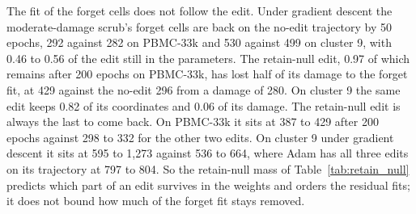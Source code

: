 \documentclass{article}
\begin{document}
The fit of the forget cells does not follow the edit. Under gradient descent the moderate-damage scrub's forget cells are back on the no-edit trajectory by 50 epochs, 292 against 282 on PBMC-33k and 530 against 499 on cluster 9, with 0.46 to 0.56 of the edit still in the parameters. The retain-null edit, 0.97 of which remains after 200 epochs on PBMC-33k, has lost half of its damage to the forget fit, at 429 against the no-edit 296 from a damage of 280. On cluster 9 the same edit keeps 0.82 of its coordinates and 0.06 of its damage. The retain-null edit is always the last to come back. On PBMC-33k it sits at 387 to 429 after 200 epochs against 298 to 332 for the other two edits. On cluster 9 under gradient descent it sits at 595 to 1,273 against 536 to 664, where Adam has all three edits on its trajectory at 797 to 804. So the retain-null mass of Table~\ref{tab:retain_null} predicts which part of an edit survives in the weights and orders the residual fits; it does not bound how much of the forget fit stays removed.
\end{document}
